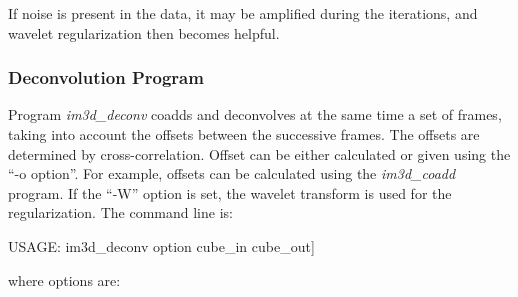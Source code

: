 If noise is present in the data, it may be amplified during the 
iterations, and wavelet regularization then becomes helpful.

\subsubsection{Deconvolution Program}

Program {\em im3d\_deconv} coadds and deconvolves at the same time a set
of frames, taking into account the
offsets between the successive frames. The offsets are determined by
cross-correlation. Offset can be either calculated or given 
using the ``-o option''. For example, offsets can be calculated using 
the {\em im3d\_coadd} program. If the ``-W'' option is set, the wavelet 
transform is used for the regularization.
The command line is: \\
{\bf
\begin{center}
 USAGE: im3d\_deconv option  cube\_in cube\_out]
\end{center}}
where options are:
